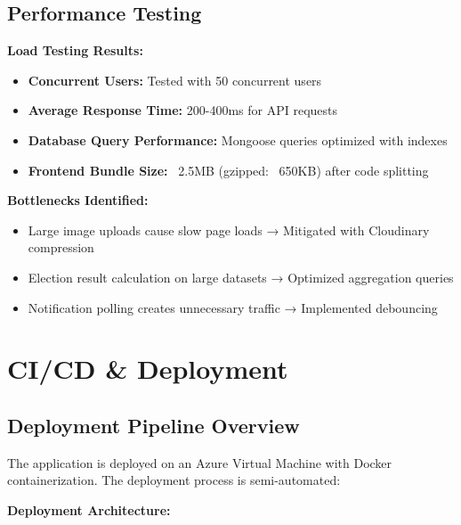 \documentclass[12pt,a4paper]{article}
\begin{document}
\subsection{Performance Testing}

\textbf{Load Testing Results:}
\begin{itemize}[noitemsep]
  \item \textbf{Concurrent Users:} Tested with 50 concurrent users
  \item \textbf{Average Response Time:} 200-400ms for API requests
  \item \textbf{Database Query Performance:} Mongoose queries optimized with indexes
  \item \textbf{Frontend Bundle Size:} ~2.5MB (gzipped: ~650KB) after code splitting
\end{itemize}

\textbf{Bottlenecks Identified:}
\begin{itemize}[noitemsep]
  \item Large image uploads cause slow page loads → Mitigated with Cloudinary compression
  \item Election result calculation on large datasets → Optimized aggregation queries
  \item Notification polling creates unnecessary traffic → Implemented debouncing
\end{itemize}

\section{CI/CD \& Deployment}

\subsection{Deployment Pipeline Overview}

The application is deployed on an Azure Virtual Machine with Docker containerization. The deployment process is semi-automated:

\textbf{Deployment Architecture:}
\begin{center}
\end{center}
\end{document}
